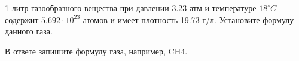 
1 литр газообразного вещества при давлении 3.23 атм и температуре $18^{\circ}C$  содержит $5.692 \cdot 10^{23}$ 
атомов и имеет плотность 19.73 г/л. Установите формулу данного газа.

В ответе запишите формулу газа, например, CH4.



